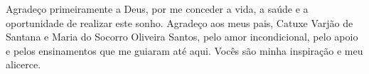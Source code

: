 \begin{agradecimentos}

Agradeço primeiramente a Deus, por me conceder a vida, a saúde e a oportunidade de realizar este sonho. Agradeço aos meus pais, Catuxe Varjão de Santana e Maria do Socorro Oliveira Santos, pelo amor incondicional, pelo apoio e pelos ensinamentos que me guiaram até aqui. Vocês são minha inspiração e meu alicerce.
\end{agradecimentos}

